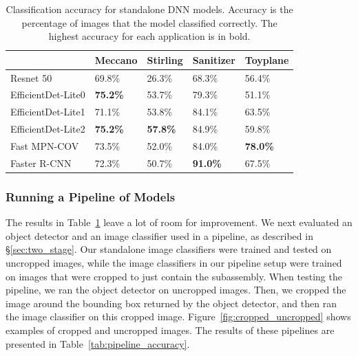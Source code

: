 \begin{table}
\begin{tabular}{|l||l|l|l|l|}
\hline
  & Meccano & Stirling & Sanitizer & Toyplane\\
  \hline
  \hline
  Resnet 50 & 69.8\% & 26.3\% & 68.3\% & 56.4\%\\
  EfficientDet-Lite0 & \textbf{75.2\%} & 53.7\% & 79.3\% & 51.1\%\\
  EfficientDet-Lite1 & 71.1\% & 53.8\% & 84.1\% & 63.5\%\\
  EfficientDet-Lite2 & \textbf{75.2\%} & \textbf{57.8\%} & 84.9\% & 59.8\%\\
  Fast MPN-COV & 73.5\% & 52.0\% & 84.0\% & \textbf{78.0\%}\\
  Faster R-CNN & 72.3\% & 50.7\% & \textbf{91.0\%} & 67.5\%\\
  \hline
\end{tabular}
  \caption{
    Classification accuracy for standalone DNN models.
    Accuracy is the percentage of images that the model classified correctly.
    The highest accuracy for each application is in bold.
  }\label{tab:standalone_accuracy}
\end{table}

\subsubsection{Running a Pipeline of Models}

The results in Table~\ref{tab:standalone_accuracy} leave a lot of room for
improvement.
We next evaluated an object detector and an image classifier used in a pipeline,
as described in \S\ref{sec:two_stage}.
Our standalone image classifiers were trained and tested
on uncropped images, while the image classifiers in our pipeline setup were
trained on images that were cropped to just contain the subassembly.
When testing the pipeline, we ran the object detector on uncropped images.
Then, we cropped the image around the bounding box returned by the object
detector, and then ran the image classifier on this cropped image.
Figure~\ref{fig:cropped_uncropped} shows examples of cropped and uncropped
images.
The results of these pipelines are presented in
Table~\ref{tab:pipeline_accuracy}.

